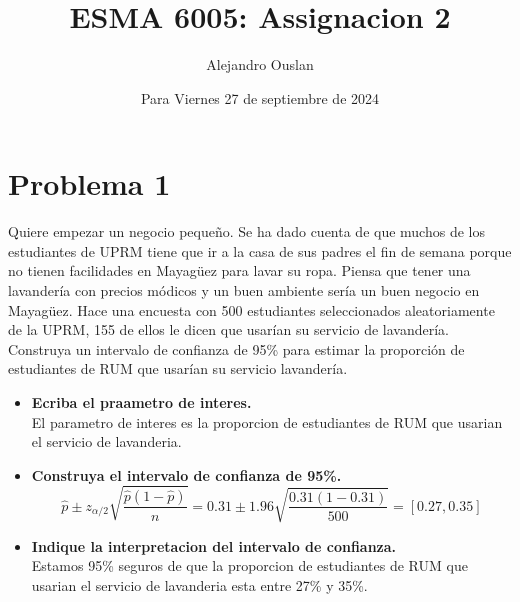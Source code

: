 \documentclass[10pt, oneside]{article}
\title{ESMA 6005: Assignacion 2}
\author{Alejandro Ouslan}
\date{Para Viernes 27 de septiembre de 2024}
\begin{document}
\maketitle

\vspace{.25in}

\section{Problema 1}
Quiere empezar un negocio pequeño. Se ha dado cuenta de que muchos de los estudiantes de
UPRM tiene que ir a la casa de sus padres el fin de semana porque no tienen facilidades en
Mayagüez para lavar su ropa. Piensa que tener una lavandería con precios módicos y un buen
ambiente sería un buen negocio en Mayagüez. Hace una encuesta con 500 estudiantes
seleccionados aleatoriamente de la UPRM, 155 de ellos le dicen que usarían su servicio de
lavandería. Construya un intervalo de confianza de 95\% para estimar la proporción de
estudiantes de RUM que usarían su servicio lavandería.

\begin{itemize}
	\item \textbf{Ecriba el praametro de interes.}\\
	      El parametro de interes es la proporcion de estudiantes de RUM que usarian el servicio de lavanderia.
	\item \textbf{Construya el intervalo de confianza de 95\%.}
	      \[
		      \hat{p} \pm z_{\alpha/2} \sqrt{\frac{\hat{p}(1-\hat{p})}{n}} = 0.31 \pm 1.96 \sqrt{\frac{0.31(1-0.31)}{500}} = [0.27,0.35]
	      \]
	\item \textbf{Indique la interpretacion del intervalo de confianza.}\\
	      Estamos 95\% seguros de que la proporcion de estudiantes de RUM que usarian el servicio de lavanderia esta entre 27\% y 35\%.


\end{itemize}
\end{document}
